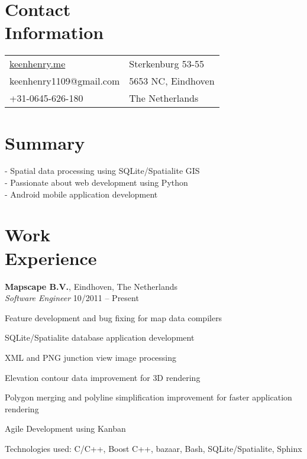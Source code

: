 \documentclass[margin,line]{resume}
\begin{document}
\begin{resume}

    \section{\myheadingstyle Contact \\ Information}
      \begin{tabular}{@{}p{7cm}p{6cm}}
      \url{keenhenry.me}      & Sterkenburg 53-55 \\
      keenhenry1109@gmail.com & 5653 NC, Eindhoven \\
      +31-0645-626-180        & The Netherlands \\
      \end{tabular}
 
    \section{\myheadingstyle Summary}
      - Spatial data processing using SQLite/Spatialite GIS \\
      - Passionate about web development using Python \\
      - Android mobile application development \\
    \vspace{-5mm}

    \section{\myheadingstyle Work \\ Experience}

    \textbf{Mapscape B.V.}, Eindhoven, The Netherlands \\
    \textsl{Software Engineer} \hfill 10/2011 -- Present \vspace{-3mm}\\\vspace{-1mm}%
      \begin{list2}
      \item Feature development and bug fixing for map data compilers
      \item SQLite/Spatialite database application development
      \item XML and PNG junction view image processing
      \item Elevation contour data improvement for 3D rendering
      \item Polygon merging and polyline simplification improvement for faster application rendering
      \item Agile Development using Kanban
      \item Technologies used: C/C++, Boost C++, bazaar, Bash, SQLite/Spatialite, Sphinx
      \end{list2}


\end{resume}
\end{document}
